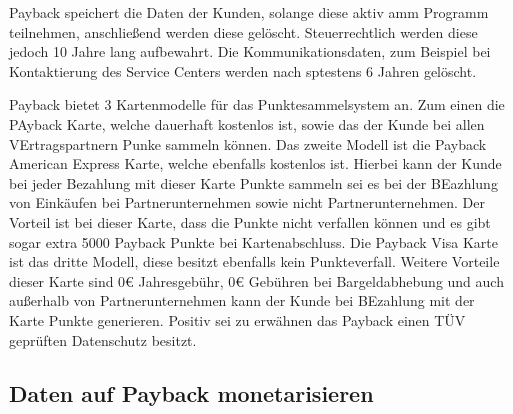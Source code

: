\noindent Payback speichert die Daten der Kunden, solange diese aktiv amm Programm teilnehmen, anschließend werden diese gelöscht. Steuerrechtlich werden diese jedoch 10 Jahre lang aufbewahrt. Die Kommunikationsdaten, zum Beispiel bei Kontaktierung des Service Centers werden nach sptestens 6 Jahren gelöscht.
\cite{Payback_Datenschutz} \newline

\noindent Payback bietet 3 Kartenmodelle für das Punktesammelsystem an. Zum einen die PAyback Karte, welche dauerhaft kostenlos ist, sowie das der Kunde bei allen VErtragspartnern Punke sammeln können. Das zweite Modell ist die Payback American Express Karte, welche ebenfalls kostenlos ist. Hierbei kann der Kunde bei jeder Bezahlung mit dieser Karte Punkte sammeln sei es bei der BEazhlung von Einkäufen bei Partnerunternehmen sowie nicht Partnerunternehmen. Der Vorteil ist bei dieser Karte, dass die Punkte nicht verfallen können und es gibt sogar extra 5000 Payback Punkte bei Kartenabschluss. Die Payback Visa Karte ist das dritte Modell, diese besitzt ebenfalls kein Punkteverfall. Weitere Vorteile dieser Karte sind 0€ Jahresgebühr, 0€ Gebühren bei Bargeldabhebung und auch außerhalb von Partnerunternehmen kann der Kunde bei BEzahlung mit der Karte Punkte generieren. Positiv sei zu erwähnen das Payback einen TÜV geprüften Datenschutz besitzt. \cite{Payback_Karten} \newline

\subsection{Daten auf Payback monetarisieren}